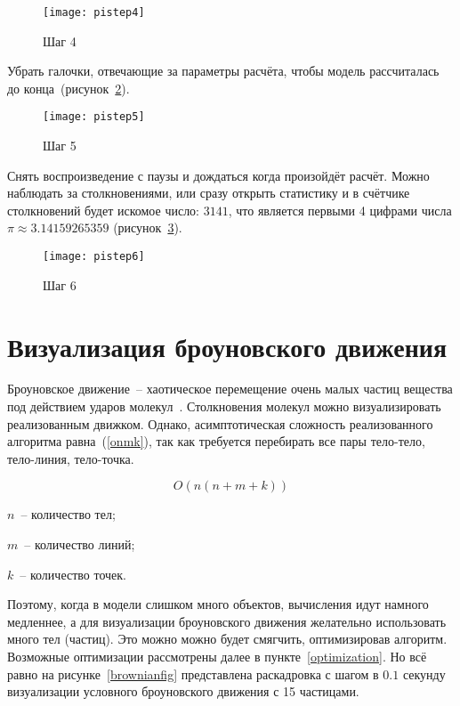 \begin{figure}[H]
    \centering
    \texttt{[image: pistep4]}
    \caption{Шаг 4\label{pistep4fig}}
\end{figure}

Убрать галочки, отвечающие за параметры расчёта, чтобы модель рассчиталась до конца~(рисунок~\ref{pistep5fig}).

\begin{figure}[H]
    \centering
    \texttt{[image: pistep5]}
    \caption{Шаг 5\label{pistep5fig}}
\end{figure}

Снять воспроизведение с паузы и дождаться когда произойдёт расчёт. Можно наблюдать за столкновениями,
или сразу открыть статистику и в счётчике столкновений будет искомое число: \(3141\), что является
первыми 4 цифрами числа \(\pi \approx 3.14159265359\) (рисунок~\ref{pistep6fig}).

\begin{figure}[H]
    \centering
    \texttt{[image: pistep6]}
    \caption{Шаг 6\label{pistep6fig}}
\end{figure}

\section{Визуализация броуновского движения}

Броуновское движение~-- хаотическое перемещение очень малых частиц вещества под действием ударов молекул~\cite{browniankrugosvet}.
Столкновения молекул можно визуализировать реализованным движком.
Однако, асимптотическая сложность реализованного алгоритма равна~(\ref{onmk}), так как требуется перебирать все пары тело-тело, тело-линия, тело-точка.

\begin{equation}\label{onmk}
    O(n(n + m + k))
\end{equation}

\begin{Underequation}
    \(n\)~-- количество тел;

    \(m\)~-- количество линий;

    \(k\)~-- количество точек.
\end{Underequation}

Поэтому, когда в модели слишком много объектов, вычисления идут намного медленнее, а для визуализации броуновского движения желательно использовать много тел (частиц).
Это можно можно будет смягчить, оптимизировав алгоритм. Возможные оптимизации рассмотрены далее в пункте~\ref{optimization}.
Но всё равно на рисунке~\ref{brownianfig} представлена раскадровка с шагом в \(0.1\) секунду визуализации условного броуновского движения с 15 частицами.

